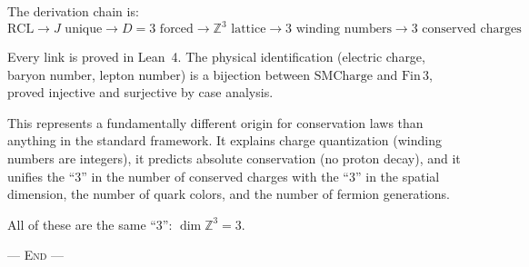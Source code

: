 \documentclass[11pt,a4paper]{article}
\theoremstyle{plain}
\theoremstyle{definition}
\theoremstyle{remark}
\newcommand{\Z}{\mathbb{Z}}
\newcommand{\Jcost}{J}
\begin{document}
The derivation chain is:
\[
\boxed{
\text{RCL} \to \Jcost \text{ unique} \to D = 3 \text{ forced}
\to \Z^3 \text{ lattice} \to 3 \text{ winding numbers}
\to 3 \text{ conserved charges}
}
\]

Every link is proved in Lean~4.  The physical identification
(electric charge, baryon number, lepton number) is a bijection between
$\text{SMCharge}$ and $\text{Fin}\,3$, proved injective and surjective
by case analysis.

This represents a fundamentally different origin for conservation laws
than anything in the standard framework.  It explains charge
quantization (winding numbers are integers), it predicts absolute
conservation (no proton decay), and it unifies the ``3'' in the number
of conserved charges with the ``3'' in the spatial dimension, the number
of quark colors, and the number of fermion generations.

All of these are the same ``3'': $\dim \Z^3 = 3$.

\bigskip
\begin{center}
\textsc{--- End ---}
\end{center}
\end{document}
